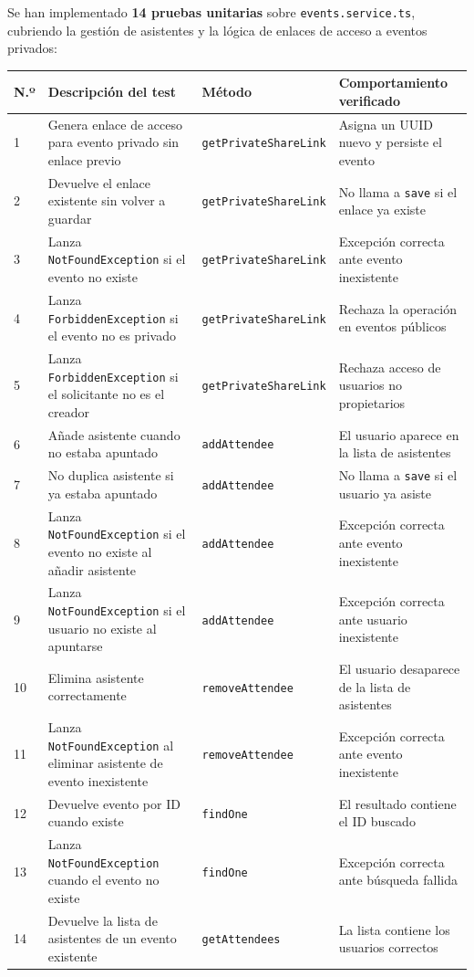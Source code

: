 Se han implementado \textbf{14 pruebas unitarias} sobre \texttt{events.service.ts}, cubriendo la gestión de asistentes y la lógica de enlaces de acceso a eventos privados:

\begin{longtable}{|p{0.5cm}|p{5.5cm}|p{3.8cm}|p{4.5cm}|}
\hline
\textbf{N.º} & \textbf{Descripción del test} & \textbf{Método} & \textbf{Comportamiento verificado} \\
\hline
1 & Genera enlace de acceso para evento privado sin enlace previo & \texttt{getPrivateShareLink} & Asigna un UUID nuevo y persiste el evento \\
\hline
2 & Devuelve el enlace existente sin volver a guardar & \texttt{getPrivateShareLink} & No llama a \texttt{save} si el enlace ya existe \\
\hline
3 & Lanza \texttt{NotFoundException} si el evento no existe & \texttt{getPrivateShareLink} & Excepción correcta ante evento inexistente \\
\hline
4 & Lanza \texttt{ForbiddenException} si el evento no es privado & \texttt{getPrivateShareLink} & Rechaza la operación en eventos públicos \\
\hline
5 & Lanza \texttt{ForbiddenException} si el solicitante no es el creador & \texttt{getPrivateShareLink} & Rechaza acceso de usuarios no propietarios \\
\hline
6 & Añade asistente cuando no estaba apuntado & \texttt{addAttendee} & El usuario aparece en la lista de asistentes \\
\hline
7 & No duplica asistente si ya estaba apuntado & \texttt{addAttendee} & No llama a \texttt{save} si el usuario ya asiste \\
\hline
8 & Lanza \texttt{NotFoundException} si el evento no existe al añadir asistente & \texttt{addAttendee} & Excepción correcta ante evento inexistente \\
\hline
9 & Lanza \texttt{NotFoundException} si el usuario no existe al apuntarse & \texttt{addAttendee} & Excepción correcta ante usuario inexistente \\
\hline
10 & Elimina asistente correctamente & \texttt{removeAttendee} & El usuario desaparece de la lista de asistentes \\
\hline
11 & Lanza \texttt{NotFoundException} al eliminar asistente de evento inexistente & \texttt{removeAttendee} & Excepción correcta ante evento inexistente \\
\hline
12 & Devuelve evento por ID cuando existe & \texttt{findOne} & El resultado contiene el ID buscado \\
\hline
13 & Lanza \texttt{NotFoundException} cuando el evento no existe & \texttt{findOne} & Excepción correcta ante búsqueda fallida \\
\hline
14 & Devuelve la lista de asistentes de un evento existente & \texttt{getAttendees} & La lista contiene los usuarios correctos \\
\hline
\end{longtable}

